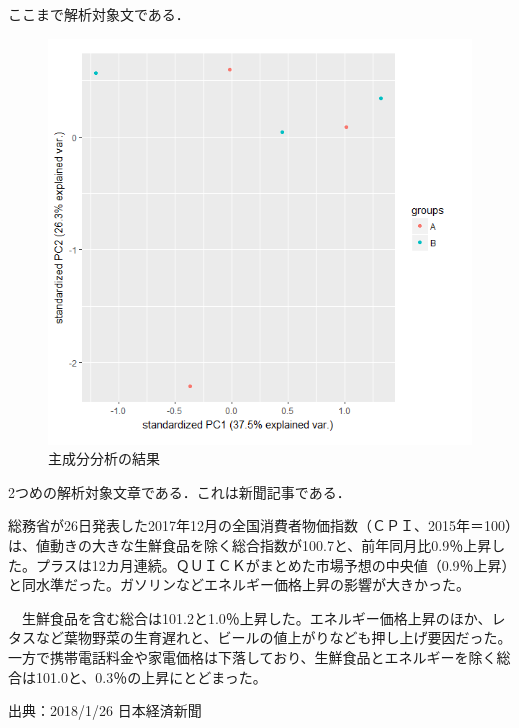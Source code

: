ここまで解析対象文である．

\begin{figure}[htb]
\centering
\includegraphics[width=13cm]{4-38.png}
\caption{主成分分析の結果}\label{4-38}
\end{figure}
\newpage

2つめの解析対象文章である．これは新聞記事である．

総務省が26日発表した2017年12月の全国消費者物価指数（ＣＰＩ、2015年＝100）は、値動きの大きな生鮮食品を除く総合指数が100.7と、前年同月比0.9％上昇した。プラスは12カ月連続。ＱＵＩＣＫがまとめた市場予想の中央値（0.9％上昇）と同水準だった。ガソリンなどエネルギー価格上昇の影響が大きかった。

　生鮮食品を含む総合は101.2と1.0％上昇した。エネルギー価格上昇のほか、レタスなど葉物野菜の生育遅れと、ビールの値上がりなども押し上げ要因だった。一方で携帯電話料金や家電価格は下落しており、生鮮食品とエネルギーを除く総合は101.0と、0.3％の上昇にとどまった。

出典：2018/1/26 日本経済新聞

